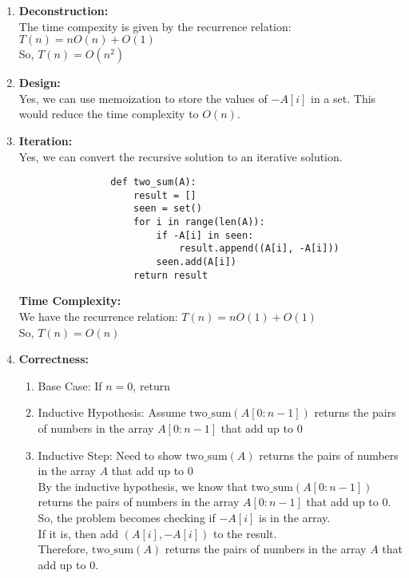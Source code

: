\documentclass[a4paper]{article}
\begin{document}
\begin{enumerate}
\begin{enumerate}
            \item \textbf{Deconstruction:} \\
            The time compexity is given by the recurrence relation: $T(n) = nO(n) + O(1)$ \\
            So, $T(n) = O(n^2)$ \\

            \item \textbf{Design:} \\
            Yes, we can use memoization to store the values of $-A[i]$ in a set. This would reduce the time complexity to $O(n)$. \\

            \item \textbf{Iteration:} \\
            Yes, we can convert the recursive solution to an iterative solution.
            \lstset{language=Python}
            \begin{lstlisting}
                def two_sum(A):
                    result = []
                    seen = set()
                    for i in range(len(A)):
                        if -A[i] in seen:
                            result.append((A[i], -A[i]))
                        seen.add(A[i])
                    return result
            \end{lstlisting}

            \textbf{Time Complexity:}\\
            We have the recurrence relation: $T(n) = nO(1) + O(1)$ \\
            So, $T(n) = O(n)$ \\

            \item \textbf{Correctness:} \\
            \begin{enumerate}
                \item Base Case: If $n = 0$, return \\
                \item Inductive Hypothesis: Assume $\text{two\_sum}(A[0:n-1])$ returns the pairs of numbers in the array $A[0:n-1]$ that add up to $0$ \\
                \item Inductive Step: Need to show $\text{two\_sum}(A)$ returns the pairs of numbers in the array $A$ that add up to $0$ \\

                By the inductive hypothesis, we know that $\text{two\_sum}(A[0:n-1])$ returns the pairs of numbers in the array $A[0:n-1]$ that add up to $0$. \\
                So, the problem becomes checking if $-A[i]$ is in the array. \\
                If it is, then add $(A[i], -A[i])$ to the result. \\
                Therefore, $\text{two\_sum}(A)$ returns the pairs of numbers in the array $A$ that add up to $0$. \\
                \end{enumerate}


\end{enumerate}
\end{enumerate}
\end{document}

